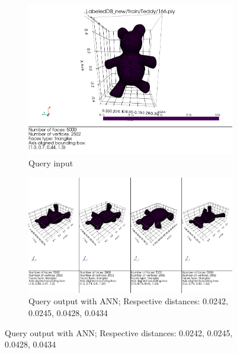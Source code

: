 \begin{figure}[H]
    \centering
    \begin{subfigure}[b]{0.3\textwidth}
        \includegraphics[width=\textwidth]{assets/queries/ann_good/input.png}
        \caption{Query input \newline}
    \end{subfigure}
    \hfill
    \begin{subfigure}[b]{0.65\textwidth}
        \includegraphics[width=\textwidth]{assets/queries/ann_good/output_ann.png}
        \caption{Query output with ANN; \newline Respective distances: 0.0242, 0.0245, 0.0428, 0.0434}
    \end{subfigure}
    \hfill
    

\end{figure}
